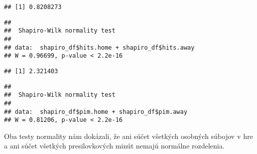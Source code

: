 \documentclass[
]{article}
\newenvironment{Shaded}{\begin{snugshade}}{\end{snugshade}}
\newcommand{\FunctionTok}[1]{\textcolor[rgb]{0.00,0.00,0.00}{#1}}
\newcommand{\NormalTok}[1]{#1}
\newcommand{\SpecialCharTok}[1]{\textcolor[rgb]{0.00,0.00,0.00}{#1}}
\begin{document}
\begin{verbatim}
## [1] 0.8208273
\end{verbatim}

\begin{Shaded}
\end{Shaded}

\begin{verbatim}
## 
##  Shapiro-Wilk normality test
## 
## data:  shapiro_df$hits.home + shapiro_df$hits.away
## W = 0.96699, p-value < 2.2e-16
\end{verbatim}

\begin{Shaded}
\end{Shaded}

\begin{verbatim}
## [1] 2.321403
\end{verbatim}

\begin{Shaded}
\end{Shaded}

\begin{verbatim}
## 
##  Shapiro-Wilk normality test
## 
## data:  shapiro_df$pim.home + shapiro_df$pim.away
## W = 0.81206, p-value < 2.2e-16
\end{verbatim}

Oba testy normality nám dokázali, že ani súčet všetkých osobných súbojov
v hre a ani súčet všetkých presilovkových minút nemajú normálne
rozdelenia.
\end{document}
